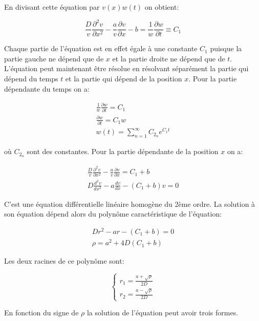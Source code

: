 \documentclass[a4paper, 12pt]{report}
\begin{document}
En divisant cette équation par $v(x) w(t)$ on obtient:

\begin{equation}
  \frac{D}{v} \frac{\partial^2 v}{\partial x^2} - \frac{a}{v} \frac{\partial v}{\partial x} -b = \frac{1}{w} \frac{\partial w}{\partial t} \equiv C_1
\end{equation}

Chaque partie de l'équation est en effet égale à une constante $C_1$ puisque
la partie gauche ne dépend que de $x$ et la partie droite ne dépend que de $t$.
L'équation peut maintenant être résolue en résolvant séparément la partie
qui dépend du temps $t$ et la partie qui dépend de la position $x$. Pour la
partie dépendante du temps on a:

\begin{align}
\frac{1}{w} \frac{\partial w}{\partial t} = C_1\\
\frac{\partial w}{\partial t} = C_1 w\\
\boxed{w(t) = \sum_{n=1}^{\infty} C_{2_n} e^{C_1 t}}
\end{align}

où $C_{2_n}$ sont des constantes. Pour la partie dépendante de la position $x$
on a:

\begin{align}
  \frac{D}{v} \frac{\partial^2v}{\partial x^2} - \frac{a}{v} \frac{\partial v}{\partial x} = C_1 + b\\
  D \frac{d^2v}{d x^2} - a \frac{d v}{d x} - (C_1 + b) v = 0
\end{align}

C'est une équation différentielle linéaire homogène du 2ème ordre. La solution à
son équation dépend alors du polynôme caractéristique de l'équation:

\begin{align}
  D r^2 - a r - (C_1 + b) = 0\\
  \rho = a^2 + 4 D (C_1 + b)
\end{align}

Les deux racines de ce polynôme sont:

\begin{equation}
  \left \{
  \begin{aligned}
  r_1 = \frac{a + \sqrt{\rho}}{2 D}\\
  r_2 = \frac{a - \sqrt{\rho}}{2 D}
  \end{aligned}
  \right.
\end{equation}

En fonction du signe de $\rho$ la solution de l'équation peut avoir trois formes.
\end{document}
